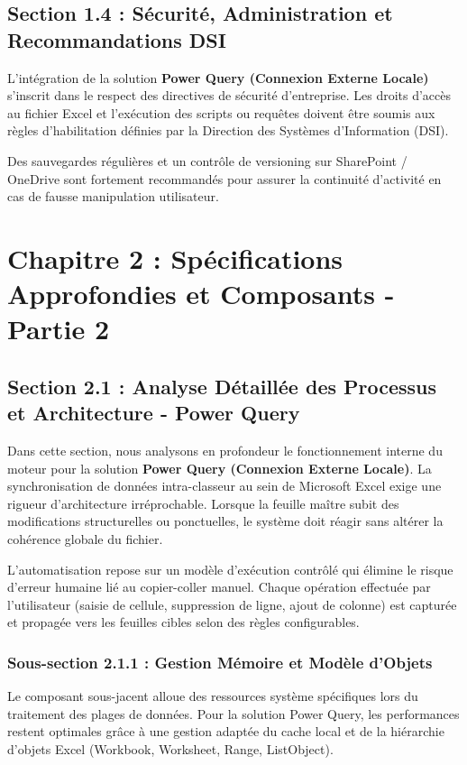 \documentclass[12pt,a4paper]{report}
\begin{document}
\section{Section 1.4 : Sécurité, Administration et Recommandations DSI}
L'intégration de la solution \textbf{Power Query (Connexion Externe Locale)} s'inscrit dans le respect des directives de sécurité d'entreprise. Les droits d'accès au fichier Excel et l'exécution des scripts ou requêtes doivent être soumis aux règles d'habilitation définies par la Direction des Systèmes d'Information (DSI).

Des sauvegardes régulières et un contrôle de versioning sur SharePoint / OneDrive sont fortement recommandés pour assurer la continuité d'activité en cas de fausse manipulation utilisateur.


\chapter{Chapitre 2 : Spécifications Approfondies et Composants - Partie 2}

\section{Section 2.1 : Analyse Détaillée des Processus et Architecture - Power Query}
Dans cette section, nous analysons en profondeur le fonctionnement interne du moteur pour la solution \textbf{Power Query (Connexion Externe Locale)}. La synchronisation de données intra-classeur au sein de Microsoft Excel exige une rigueur d'architecture irréprochable. Lorsque la feuille maître subit des modifications structurelles ou ponctuelles, le système doit réagir sans altérer la cohérence globale du fichier.

L'automatisation repose sur un modèle d'exécution contrôlé qui élimine le risque d'erreur humaine lié au copier-coller manuel. Chaque opération effectuée par l'utilisateur (saisie de cellule, suppression de ligne, ajout de colonne) est capturée et propagée vers les feuilles cibles selon des règles configurables.


\subsection{Sous-section 2.1.1 : Gestion Mémoire et Modèle d'Objets}
Le composant sous-jacent alloue des ressources système spécifiques lors du traitement des plages de données. Pour la solution Power Query, les performances restent optimales grâce à une gestion adaptée du cache local et de la hiérarchie d'objets Excel (Workbook, Worksheet, Range, ListObject).
\end{document}
